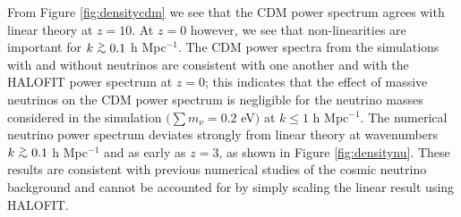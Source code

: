 \documentclass{aastex}
\def\gtsima{$\; \buildrel > \over \sim \;$}
\def\gsim{\lower.5ex\hbox{\gtsima}}
\newcommand{\halofit}{HALOFIT }
\newcommand{\halofitns}{HALOFIT}
\begin{document}
From Figure \ref{fig:densitycdm} we see that the CDM power
spectrum agrees with linear theory at
$z=10$.
At $z=0$ however, we see that non-linearities are important for $k\gsim
0.1$ h Mpc$^{-1}$.  The CDM power spectra from the
simulations with and without neutrinos are
consistent with one another and with
the \halofit power spectrum at $z=0$; this indicates that the
effect of massive neutrinos on the CDM power spectrum
is negligible for the neutrino masses considered in the simulation $\big(\sum
m_\nu = 0.2$ eV$\big)$ at $k\le 1$ h Mpc$^{-1}$.  
The numerical neutrino power spectrum deviates strongly from linear theory at wavenumbers
$k\gsim0.1$ h Mpc$^{-1}$ and as early as $z=3$, as shown in Figure \ref{fig:densitynu}.  These
results are consistent with previous numerical studies of the cosmic
neutrino background
\citep{brandbyge082,inman15} and cannot be
accounted for by simply scaling the linear result using \halofitns.
\end{document}
